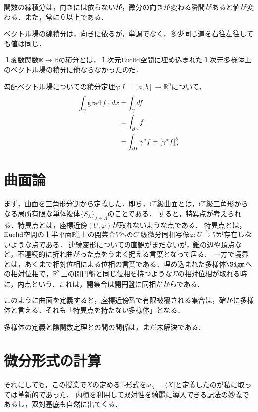 \documentclass[uplatex, dvipdfmx]{jsreport}
\begin{document}
\begin{screen}
    関数の線積分は，向きには依らないが，微分の向きが変わる瞬間があると値が変わる．また，常に０以上である．

    ベクトル場の線積分は，向きに依るが，単調でなく，多少同じ道を右往左往しても値は同じ．

    １変数関数$\mathbb{R}\to\mathbb{R}$の積分とは，１次元Euclid空間に埋め込まれた１次元多様体上のベクトル場の積分に他ならなかったのだ．
\end{screen}

\begin{itembox}[l]{勾配ベクトル場についての積分定理}$\gamma:I=[a,b]\to\mathbb{R}^n$について，
    \begin{align*}
        \int_\gamma\operatorname{\mathrm{grad}} f\cdot dx &= \int_{\gamma}df \\
        &= \int_{\partial\gamma}f \\
        &= \int_{\partial I}\gamma^*f = \left[\gamma^*f\right]^b_a
    \end{align*}
\end{itembox}

\section{曲面論}

まず，曲面を三角形分割から定義した．即ち，$C^r$級曲面とは，$C^r$級三角形からなる局所有限な単体複体$\{S_\lambda\}_{\lambda\in\Lambda}$のことである．
すると，特異点が考えられる．特異点とは，座標近傍$(U,\varphi)$が取れないような点である．
特異点とは，Euclid空間の上半平面$\mathbb{R}^2_+$上の開集合$V$への$C^r$級微分同相写像$\varphi:U\xrightarrow{\sim} V$が存在しないような点である．
連続変形についての直観がまだないが，錐の辺や頂点など，不連続的に折れ曲がった点をうまく捉える言葉となって居る．
一方で境界とは，あくまで相対位相による位相の言葉である．埋め込まれた多様体$\Sigm$への相対位相で，$\mathbb{R}^2_+$上の開円盤と同じ位相を持つような$\Sigma$の相対位相が取れる時に，内点という．これは，開集合は開円盤に同相だからである．

このように曲面を定義すると，座標近傍系で有限被覆される集合は，確かに多様体と言える．それも「特異点を持たない多様体」となる．

多様体の定義と陰関数定理との間の関係は，まだ未解決である．



\section{微分形式の計算}
それにしても，この授業で$X$の定める1-形式を$\omega_X=\langle X|$と定義したのが私に取っては革新的であった．
内積を利用して双対性を綺麗に導入できる記法の妙義であるし，双対基底も自然に出てくる．
\end{document}
